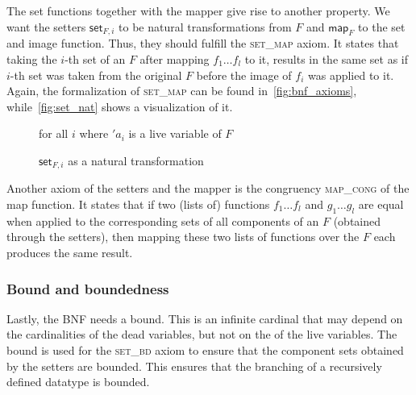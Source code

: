         The set functions together with the mapper give rise to another property. We want the setters $\textsf{set}_{F,i}$ to be natural transformations from $F$ and $\textsf{map}_F$ to the set and image function. Thus, they should fulfill the \textsc{set\_map} axiom. It states that taking the $i$-th set of an $F$ after mapping $f_1 \dots f_l$ to it, results in the same set as if $i$-th set was taken from the original $F$ before the image of $f_i$ was applied to it. Again, the formalization of \textsc{set\_map} can be found in~\autoref{fig:bnf_axioms}, while~\autoref{fig:set_nat} shows a visualization of it.
        \begin{figure}[!h]
          \centering
          \newline
          \footnotesize
          for all $i$ where $'a_i$ is a live variable of $F$
          \caption{$\textsf{set}_{F,i}$ as a natural transformation}
          \label{fig:set_nat}
        \end{figure}

        \noindent Another axiom of the setters and the mapper is the congruency \textsc{map\_cong} of the map function. It states that if two (lists of) functions $f_1 \dots f_l$ and $g_1 \dots g_l$ are equal when applied to the corresponding sets of all components of an $F$ (obtained through the setters), then mapping these two lists of functions over the $F$ each produces the same result. 

      \subsubsection{Bound and boundedness}
        Lastly, the \ac{BNF} needs a bound. This is an infinite cardinal that may depend on the cardinalities of the dead variables, but not on the of the live variables. The bound is used for the \textsc{set\_bd} axiom to ensure that the component sets obtained by the setters are bounded. This ensures that the branching of a recursively defined datatype is bounded.


